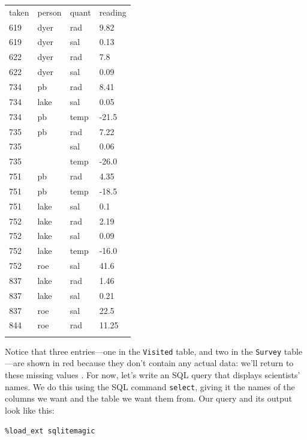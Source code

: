 \documentclass{book}
\begin{document}
\begin{tabular}{@{}llll@{}}
\hline\noalign{\medskip}
taken & person & quant & reading
\\\noalign{\medskip}
\hline\noalign{\medskip}
619 & dyer & rad & 9.82
\\\noalign{\medskip}
619 & dyer & sal & 0.13
\\\noalign{\medskip}
622 & dyer & rad & 7.8
\\\noalign{\medskip}
622 & dyer & sal & 0.09
\\\noalign{\medskip}
734 & pb & rad & 8.41
\\\noalign{\medskip}
734 & lake & sal & 0.05
\\\noalign{\medskip}
734 & pb & temp & -21.5
\\\noalign{\medskip}
735 & pb & rad & 7.22
\\\noalign{\medskip}
735 & ~ & sal & 0.06
\\\noalign{\medskip}
735 & ~ & temp & -26.0
\\\noalign{\medskip}
751 & pb & rad & 4.35
\\\noalign{\medskip}
751 & pb & temp & -18.5
\\\noalign{\medskip}
751 & lake & sal & 0.1
\\\noalign{\medskip}
752 & lake & rad & 2.19
\\\noalign{\medskip}
752 & lake & sal & 0.09
\\\noalign{\medskip}
752 & lake & temp & -16.0
\\\noalign{\medskip}
752 & roe & sal & 41.6
\\\noalign{\medskip}
837 & lake & rad & 1.46
\\\noalign{\medskip}
837 & lake & sal & 0.21
\\\noalign{\medskip}
837 & roe & sal & 22.5
\\\noalign{\medskip}
844 & roe & rad & 11.25
\\\noalign{\medskip}
\hline
\end{tabular}

Notice that three entries---one in the \texttt{Visited} table, and two
in the \texttt{Survey} table---are shown in red because they don't
contain any actual data: we'll return to these missing values
. For now, let's write an SQL query that
displays scientists' names. We do this using the SQL command
\texttt{select}, giving it the names of the columns we want and the
table we want them from. Our query and its output look like this:

\begin{verbatim}
%load_ext sqlitemagic
\end{verbatim}
\end{document}
